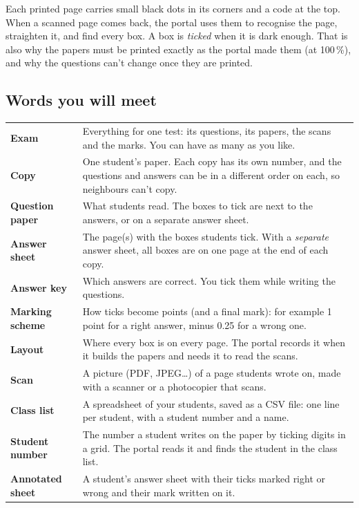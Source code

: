 \documentclass[11pt]{article}
\begin{document}
\begin{why}
Each printed page carries small black dots in its corners and a code at the top. When a scanned page comes back, the portal uses them to recognise the page, straighten it, and find every box. A box is \emph{ticked} when it is dark enough. That is also why the papers must be printed exactly as the portal made them (at 100\,\%), and why the questions can't change once they are printed.
\end{why}

\needspace{0.72\textheight}
\subsection{Words you will meet}\label{sec:words}

\begin{panel}
\renewcommand{\arraystretch}{1.25}
\begin{tabularx}{\linewidth}{@{}>{\bfseries}p{33mm}X@{}}
Exam & Everything for one test: its questions, its papers, the scans and the marks. You can have as many as you like.\\
Copy & One student's paper. Each copy has its own number, and the questions and answers can be in a different order on each, so neighbours can't copy.\\
Question paper & What students read. The boxes to tick are next to the answers, or on a separate answer sheet.\\
Answer sheet & The page(s) with the boxes students tick. With a \emph{separate} answer sheet, all boxes are on one page at the end of each copy.\\
Answer key & Which answers are correct. You tick them while writing the questions.\\
Marking scheme & How ticks become points (and a final mark): for example 1 point for a right answer, minus 0.25 for a wrong one.\\
Layout & Where every box is on every page. The portal records it when it builds the papers and needs it to read the scans.\\
Scan & A picture (PDF, JPEG\ldots) of a page students wrote on, made with a scanner or a photocopier that scans.\\
Class list & A spreadsheet of your students, saved as a CSV file: one line per student, with a student number and a name.\\
Student number & The number a student writes on the paper by ticking digits in a grid. The portal reads it and finds the student in the class list.\\
Annotated sheet & A student's answer sheet with their ticks marked right or wrong and their mark written on it.\\
\end{tabularx}
\end{panel}
\end{document}
